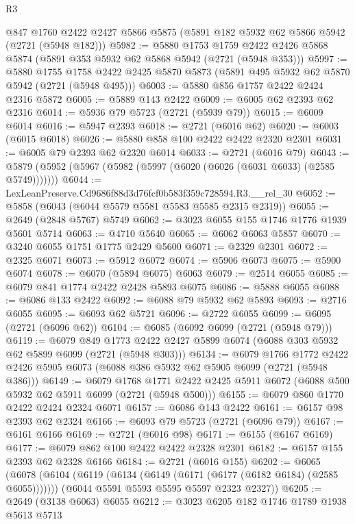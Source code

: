 \begin{lexlean}{R3}
\begin{coremodule}
    @847
    @1760
    @2422
    @2427
    @5866
    @5875
    (@5891 @182 @5932 @62 @5866 @5942 (@2721 (@5948 @182)))
@5982 := @5880
    @1753
    @1759
    @2422
    @2426
    @5868
    @5874
    (@5891 @353 @5932 @62 @5868 @5942 (@2721 (@5948 @353)))
@5997 := @5880
    @1755
    @1758
    @2422
    @2425
    @5870
    @5873
    (@5891 @495 @5932 @62 @5870 @5942 (@2721 (@5948 @495)))
@6003 := @5880 @856 @1757 @2422 @2424 @2316 @5872
@6005 := @5889 @143 @2422
@6009 := @6005 @62 @2393 @62 @2316
@6014 := @5936 @79 @5723 (@2721 (@5939 @79))
@6015 := @6009 @6014
@6016 := @5947 @2393
@6018 := @2721 (@6016 @62)
@6020 := @6003 (@6015 @6018)
@6026 := @5880 @858 @100 @2422 @2422 @2320 @2301
@6031 := @6005 @79 @2393 @62 @2320 @6014
@6033 := @2721 (@6016 @79)
@6043 := @5879 (@5952 (@5967 (@5982 (@5997 (@6020 (@6026 (@6031 @6033) (@2585 @5749)))))))
@6044 := LexLeanPreserve.Cd9686f88d3d76fcf0b583f359c728594.R3.__rel_30
@6052 := @5858 (@6043 (@6044 @5579 @5581 @5583 @5585 @2315 @2319))
@6055 := @2649 (@2848 @5767) @5749
@6062 := @3023 @6055 @155 @1746 @1776 @1939 @5601 @5714
@6063 := @4710 @5640
@6065 := @6062 @6063 @5857
@6070 := @3240 @6055 @1751 @1775 @2429 @5600
@6071 := @2329 @2301
@6072 := @2325 @6071
@6073 := @5912 @6072
@6074 := @5906 @6073
@6075 := @5900 @6074
@6078 := @6070 (@5894 @6075) @6063
@6079 := @2514 @6055
@6085 := @6079 @841 @1774 @2422 @2428 @5893 @6075
@6086 := @5888 @6055
@6088 := @6086 @133 @2422
@6092 := @6088 @79 @5932 @62 @5893
@6093 := @2716 @6055
@6095 := @6093 @62 @5721
@6096 := @2722 @6055
@6099 := @6095 (@2721 (@6096 @62))
@6104 := @6085 (@6092 @6099 (@2721 (@5948 @79)))
@6119 := @6079
    @849
    @1773
    @2422
    @2427
    @5899
    @6074
    (@6088 @303 @5932 @62 @5899 @6099 (@2721 (@5948 @303)))
@6134 := @6079
    @1766
    @1772
    @2422
    @2426
    @5905
    @6073
    (@6088 @386 @5932 @62 @5905 @6099 (@2721 (@5948 @386)))
@6149 := @6079
    @1768
    @1771
    @2422
    @2425
    @5911
    @6072
    (@6088 @500 @5932 @62 @5911 @6099 (@2721 (@5948 @500)))
@6155 := @6079 @860 @1770 @2422 @2424 @2324 @6071
@6157 := @6086 @143 @2422
@6161 := @6157 @98 @2393 @62 @2324
@6166 := @6093 @79 @5723 (@2721 (@6096 @79))
@6167 := @6161 @6166
@6169 := @2721 (@6016 @98)
@6171 := @6155 (@6167 @6169)
@6177 := @6079 @862 @100 @2422 @2422 @2328 @2301
@6182 := @6157 @155 @2393 @62 @2328 @6166
@6184 := @2721 (@6016 @155)
@6202 := @6065
    (@6078
      (@6104 (@6119 (@6134 (@6149 (@6171 (@6177 (@6182 @6184) (@2585 @6055)))))))
      (@6044 @5591 @5593 @5595 @5597 @2323 @2327))
@6205 := @2649 (@3138 @6063) @6055
@6212 := @3023 @6205 @182 @1746 @1789 @1938 @5613 @5713

\end{coremodule}
\end{lexlean}
